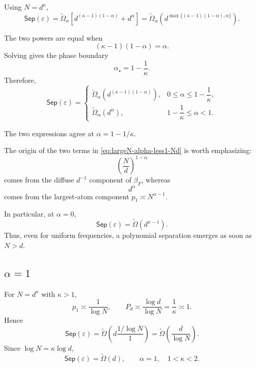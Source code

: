\documentclass[11pt]{article}
\newcommand{\Sep}{\mathsf{Sep}}
\newcommand{\eps}{\varepsilon}
\begin{document}
Using $N=d^\kappa$,
\begin{equation}
\boxed{
\Sep(\eps) = \widetilde\Omega_\alpha\left[ d^{(\kappa-1)(1-\alpha)} +d^\alpha \right] = \widetilde\Omega_\alpha\left( d^{\max\{(\kappa-1)(1-\alpha), \alpha\}} \right).
}
\label{eq:largeN-kappa-alpha-less1}
\end{equation}

The two powers are equal when
\[
(\kappa-1)(1-\alpha)=\alpha.
\]
Solving gives the phase boundary
\begin{equation}
\alpha_\star = 1-\frac1\kappa.
\label{eq:alpha-star}
\end{equation}
Therefore,
\begin{equation}
\boxed{
\Sep(\eps) =
\begin{cases}
\widetilde\Omega_\alpha\left( d^{(\kappa-1)(1-\alpha)} \right), & 0\le\alpha\le 1-\dfrac1\kappa, \\[3mm]
\widetilde\Omega_\alpha(d^\alpha), & 1-\dfrac1\kappa\le\alpha<1.
\end{cases}
}
\label{eq:largeN-alpha-less1-piecewise}
\end{equation}

The two expressions agree at
$\alpha=1-1/\kappa$.

The origin of the two terms in
\eqref{eq:largeN-alpha-less1-Nd} is worth emphasizing:
\[
\left(\frac Nd\right)^{1-\alpha}
\]
comes from the diffuse $d^{-1}$ component of $\beta_F$, whereas
\[
d^\alpha
\]
comes from the largest-atom component
$p_1\asymp N^{\alpha-1}$.

In particular, at $\alpha=0$,
\[
\boxed{
\Sep(\eps) = \widetilde\Omega\left(d^{\kappa-1}\right).
}
\]
Thus, even for uniform frequencies, a polynomial separation emerges
as soon as $N>d$.

\subsection{\texorpdfstring{$\alpha=1$}{alpha equals one}}

For $N=d^\kappa$ with $\kappa>1$,
\[
p_1\asymp\frac1{\log N}, \qquad P_d \asymp \frac{\log d}{\log N} = \frac1\kappa \asymp1.
\]
Hence
\[
\Sep(\eps) = \widetilde\Omega\left( d\frac{1/\log N}{1} \right) = \widetilde\Omega\left( \frac d{\log N} \right).
\]
Since $\log N=\kappa\log d$,
\begin{equation}
\boxed{
\Sep(\eps) = \widetilde\Omega(d), \qquad \alpha=1,\quad 1<\kappa<2.
}
\label{eq:largeN-alpha1}
\end{equation}
\end{document}
